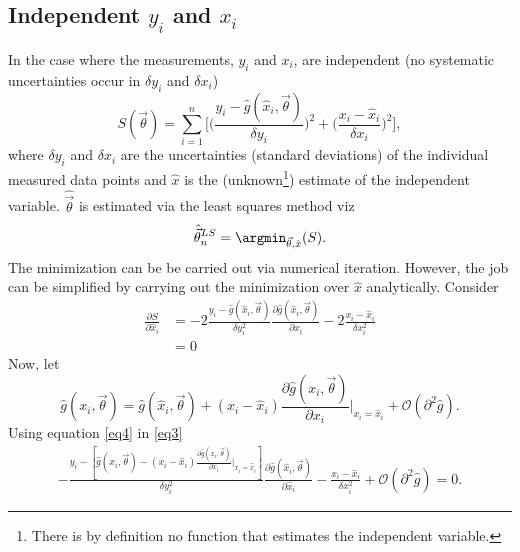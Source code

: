 \subsection{Independent $y_i$ and $x_i$} In the case where the measurements, $y_i$ and $x_i$, are independent (no systematic uncertainties occur in $\delta y_i$ and $\delta x_i$)
\begin{equation}
	S(\vec{\theta})=\sum_{i=1}^n\bigg[\bigg(\frac{y_i-\hat{g}(\hat{x}_i,\vec{\theta})}{\delta y_i}\bigg)^2+\bigg(\frac{x_i-\hat{x}_i}{\delta x_i}\bigg)^2\bigg],
	\label{eq6}
\end{equation}
where $\delta y_i$ and $\delta x_i$ are the uncertainties (standard deviations) of the individual measured data points and $\hat{x}$ is the (unknown\footnote{There is by definition no function that estimates the independent variable.}) estimate of the independent variable. $\hat{\vec{\theta}}$ is estimated via the least squares method viz
\begin{equation}
	\hat{\vec{ \theta}}_n^{LS}=\argmin_{\vec{\theta},\hat{x}}(S).
\end{equation}
The minimization can be be carried out via numerical iteration. However, the job can be simplified by carrying out the minimization over $\hat{x}$ analytically. Consider
\begin{equation}
	\begin{split}
		\frac{\partial S}{\partial \hat{x}_i}&=-2\frac{y_i-\hat{g}(\hat{x}_i,\vec{\theta})}{\delta y_i^2}\frac{\partial \hat{g}(\hat{x}_i,\vec{\theta})}{\partial \hat{x}_i}-2\frac{x_i-\hat{x}_i}{\delta x_i^2}\\
		&=0
	\end{split}
	\label{eq3}
\end{equation}
Now, let
\begin{equation}
	\hat{g}(x_i,\vec{\theta})=\hat{g}(\hat{x}_i,\vec{\theta})+(x_i-\hat{x}_i)\frac{\partial \hat{g}(x_i,\vec{\theta})}{\partial x_i}\bigg|_{x_i=\hat{x}_i}+\mathcal{O}(\partial^2\hat{g}).
	\label{eq4}
\end{equation}
Using equation \eqref{eq4} in \eqref{eq3}
\begin{equation}
	\begin{split}
		-\frac{y_i-[\hat{g}(x_i,\vec{\theta})-(x_i-\hat{x}_i)\frac{\partial \hat{g}(x_i,\vec{\theta})}{\partial x_i}\bigg|_{x_i=\hat{x}_i}]}{\delta y_i^2}\frac{\partial \hat{g}(\hat{x}_i,\vec{\theta})}{\partial \hat{x}_i}-\frac{x_i-\hat{x}_i}{\delta x_i^2}+\mathcal{O}(\partial^2\hat{g})=0.
	\end{split}
\end{equation}
